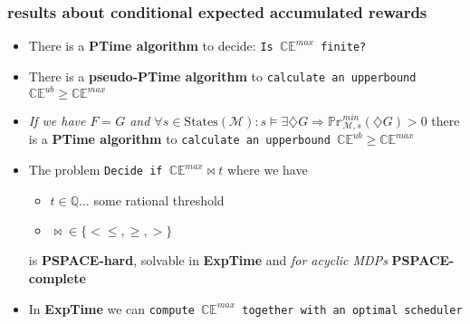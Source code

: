 \documentclass[onlymath]{beamer}
\begin{document}
\begin{comment}
	
\begin{frame}
	\frametitle{conditional expected accumulated reward}
	Given:
	\begin{itemize}
		\item MDP $\mathcal{M}$ with non-negative integer weights
		\item two sets of states $F, G \subseteq \mathrm{States}(\mathcal{M})$
	\end{itemize}
	\begin{definition}
		\[
		\mathbb{CE}^{max} \coloneqq \sup_{\mathfrak{S} \in S}(\mathcal{E}_{\mathcal{M}, s_init}^{\mathfrak{S}}(\boxplus F \mid \diamondsuit G))
		\]
		where $S$ is the set of schedulers: %
		\[
		S \coloneqq \{\mathfrak{S} \mid \mathbb{Pr}_{\mathcal{M},s_init}^{\mathfrak{S}}(\diamondsuit G) > 0 \land \mathbb{Pr}_{\mathcal{M},s_init}^{\mathfrak{S}}(\diamondsuit F \mid \diamondsuit G) = 1\}
		\]
		
	\end{definition}
	
\end{frame}
\end{comment}

\begin{frame}
\frametitle{results about conditional expected accumulated rewards}
\begin{itemize}
	\item There is a \textbf{PTime algorithm} to decide: \texttt{Is $\mathbb{CE}^{max}$ finite?}
	\item There is a \textbf{pseudo-PTime algorithm} to \texttt{calculate an upperbound $\mathbb{CE}^{ub} \geq \mathbb{CE}^{max}$}
	\item \textit{If we have $F=G$ and $\forall s \in \mathrm{States}(\mathcal{M}): s \vDash \exists \diamondsuit G \Rightarrow \mathbb{Pr}_{\mathcal{M},s}^{min}(\diamondsuit G) > 0$ } there is a \textbf{PTime algorithm} to \texttt{calculate an upperbound $\mathbb{CE}^{ub} \geq \mathbb{CE}^{max}$}
	\item The problem \texttt{Decide if $\mathbb{CE}^{max} \bowtie t$} where we have
	\begin{itemize}
		\item $t\in \mathbb{Q}\dots$ some rational threshold
		\item $\bowtie \in \{<\leq,\geq,>\}$
	\end{itemize} is \textbf{PSPACE-hard}, solvable in \textbf{ExpTime} and \textit{for acyclic MDPs} \textbf{PSPACE-complete}
	\item In \textbf{ExpTime} we can \texttt{compute $\mathbb{CE}^{max}$ together with an optimal scheduler}
\end{itemize}

\end{frame}
\end{document}

